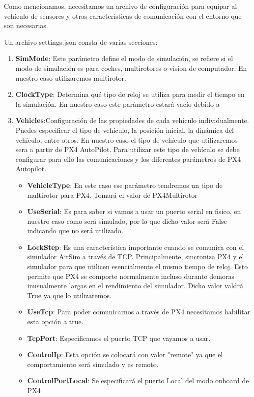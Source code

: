 Como mencionamos, necesitamos un archivo de configuración para equipar al vehículo de sensores y otras características de comunicación con el entorno que son necesarias. 

Un archivo settings.json consta de varias secciones: 
\begin{enumerate}
  \item \textbf{SimMode}: Este parámetro define el modo de simulación, se refiere si el modo de simulación es para coches, multirotores o vision de computador. En nuestro caso
  utilizaremos multirotor. 
  \item \textbf{ClockType}: Determina qué tipo de reloj se utiliza para medir el tiempo en la simulación. En nuestro caso este parámetro estará vacío debido a 
  \item \textbf{Vehicles}:Configuración de  las propiedades de cada vehículo individualmente. Puedes especificar el tipo de vehículo, la posición inicial, la dinámica del vehículo, entre otros.
  En nuestro caso el tipo de vehículo que utilizaremos sera a partir de PX4 AutoPilot. Para utilizar este tipo de vehículo se debe configurar para ello las comunicaciones y 
  los diferentes parámetros de PX4 Autopilot. 
  \begin{itemize}
    \item \textbf{VehicleType}: En este caso ese parámetro tendremos un tipo de multirotor para PX4. Tomará el valor de PX4Multirotor
    \item \textbf{UseSerial}: Es para saber si vamos a usar un puerto serial en fisico, en nuestro caso como será simulado, por lo que dicho valor será False indicando que no 
    será utilizado.
    \item \textbf{LockStep}: Es una característica importante cuando se comunica con el simulador AirSim a través de TCP. Principalmente, sincroniza PX4 y el simulador para que utilicen esencialmente el mismo tiempo de reloj. 
    Esto permite que PX4 se comporte normalmente incluso durante demoras inusualmente largas en el rendimiento del simulador. Dicho valor valdrá True ya que lo utilizaremos. 
    \item \textbf{UseTcp}: Para poder comunicarnos a través de PX4 necesitamos habilitar esta opción a true.
    \item \textbf{TcpPort}: Especificamos el puerto TCP que vayamos a usar. 
    \item \textbf{ControlIp}: Esta opción se colocará con valor "remote" ya que el comportamiento será simulado y es remoto.
    \item \textbf{ControlPortLocal}: Se especificará el puerto Local del modo onboard de PX4 

\end{itemize}
\end{enumerate}
